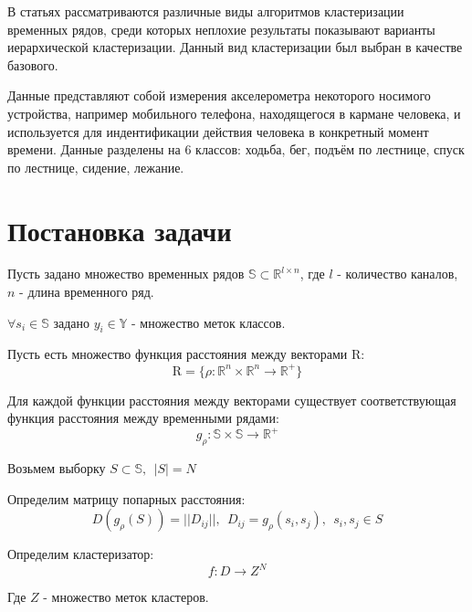 \documentclass[12pt,twoside]{article}
\begin{document}
        В статьях \cite{WARRENLIAO20051857} \cite{AGHABOZORGI201516} рассматриваются различные виды алгоритмов кластеризации временных рядов,
        среди которых неплохие результаты показывают варианты иерархической кластеризации.
        Данный вид кластеризации был выбран в качестве базового.
        
        Данные \cite{Kwapisz:2011:ARU:1964897.1964918} представляют собой измерения акселерометра некоторого носимого устройства,
        например мобильного телефона, находящегося в кармане человека, и используется для индентификации действия человека в конкретный момент времени.
        Данные разделены на 6 классов: ходьба, бег, подъём по лестнице, спуск по лестнице, сидение, лежание.
				
    \section{Постановка задачи}
        
        Пусть задано множество временных рядов $\mathbb{S} \subset \mathbb{R}^{l \times n}$,
        где $l$ \-- количество каналов, $n$ \-- длина временного ряд.

        $\forall s_i \in \mathbb{S}$ задано ${y_i \in \mathbb{Y}}$ \-- множество меток классов.

        Пусть есть множество функция расстояния между векторами $\mathrm{R}$:
        $$
            \mathrm{R} = \{\rho: \mathbb{R}^n \times \mathbb{R}^n \rightarrow \mathbb{R}^+ \}
        $$

        Для каждой функции расстояния между векторами существует соответствующая функция расстояния между временными рядами:
        $$
            g_{\rho}: \mathbb{S} \times \mathbb{S} \rightarrow \mathbb{R}^+ 
        $$

        Возьмем выборку $ S \subset \mathbb{S}, \ \ |S| = N$

        Определим матрицу попарных расстояния:
        $$
            D(g_\rho(S)) = ||D_{ij}||, \ \ D_{ij} = g_\rho(s_i, s_j),\ \ s_i, s_j \in S 
        $$
        
        Определим кластеризатор:
        $$
            f: D \rightarrow Z^N
        $$

        Где $Z$ \-- множество меток кластеров.
\end{document}
